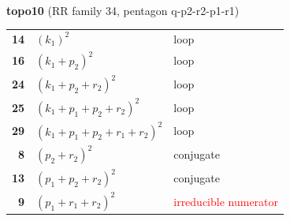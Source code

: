 \documentclass[10pt]{article}
\begin{document}
\begin{minipage}[t]{0.48\textwidth}
{}\\[2mm]\textbf{topo10} (RR family 34, pentagon q-p2-r2-p1-r1)\\[2pt]{\footnotesize\begin{tabular}{@{}r@{\ \ }l@{\ \ }l@{}}\textbf{14} & $(k_1)^2$ & loop\\
\textbf{16} & $(k_1+p_2)^2$ & loop\\
\textbf{24} & $(k_1+p_2+r_2)^2$ & loop\\
\textbf{25} & $(k_1+p_1+p_2+r_2)^2$ & loop\\
\textbf{29} & $(k_1+p_1+p_2+r_1+r_2)^2$ & loop\\
\textbf{8} & $(p_2+r_2)^2$ & conjugate\\
\textbf{13} & $(p_1+p_2+r_2)^2$ & conjugate\\
\textbf{9} & $(p_1+r_1+r_2)^2$ & \textcolor{red}{irreducible numerator}\\\end{tabular}}\end{minipage}

\bigskip
\end{document}
